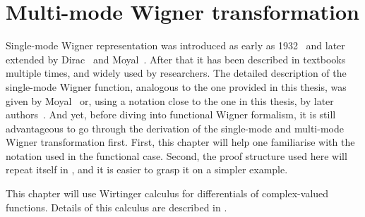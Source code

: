 \chapter{Multi-mode Wigner transformation}
\label{cha:mm-wigner}

Single-mode Wigner representation was introduced as early as 1932~\cite{Wigner1932} and later extended by Dirac~\cite{Dirac1945} and Moyal~\cite{Moyal1947}.
After that it has been described in textbooks multiple times, and widely used by researchers.
The detailed description of the single-mode Wigner function, analogous to the one provided in this thesis, was given by Moyal~\cite{Moyal1947} or, using a notation close to the one in this thesis, by later authors~\cite{Cahill1969,Hillery1984,Gardiner2004}.
And yet, before diving into functional Wigner formalism, it is still advantageous to go through the derivation of the single-mode and multi-mode Wigner transformation first.
First, this chapter will help one familiarise with the notation used in the functional case.
Second, the proof structure used here will repeat itself in , and it is easier to grasp it on a simpler example.

This chapter will use Wirtinger calculus for differentials of complex-valued functions.
Details of this calculus are described in .





